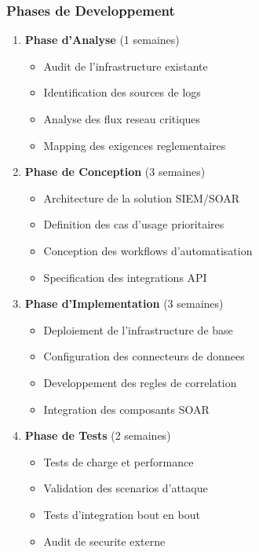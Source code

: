 \subsubsection{Phases de Developpement}
\begin{enumerate}
    \item \textbf{Phase d'Analyse} (1 semaines)
          \begin{itemize}
              \item Audit de l'infrastructure existante
              \item Identification des sources de logs
              \item Analyse des flux reseau critiques
              \item Mapping des exigences reglementaires
          \end{itemize}

    \item \textbf{Phase de Conception} (3 semaines)
          \begin{itemize}
              \item Architecture de la solution SIEM/SOAR
              \item Definition des cas d'usage prioritaires
              \item Conception des workflows d'automatisation
              \item Specification des integrations API
          \end{itemize}

    \item \textbf{Phase d'Implementation} (3 semaines)
          \begin{itemize}
              \item Deploiement de l'infrastructure de base
              \item Configuration des connecteurs de donnees
              \item Developpement des regles de correlation
              \item Integration des composants SOAR
          \end{itemize}

    \item \textbf{Phase de Tests} (2 semaines)
          \begin{itemize}
              \item Tests de charge et performance
              \item Validation des scenarios d'attaque
              \item Tests d'integration bout en bout
              \item Audit de securite externe
          \end{itemize}


\end{enumerate}
\clearpage

